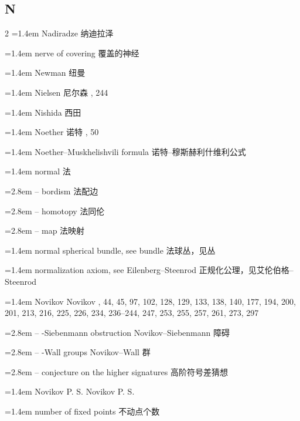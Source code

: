 \subsection*{N}
\small
\begin{multicols}{2}
\noindent\hangindent=1.4em Nadiradze \quad 纳迪拉泽 \par
\noindent\hangindent=1.4em nerve of covering \quad 覆盖的神经 \par
\noindent\hangindent=1.4em Newman \quad 纽曼 \par
\noindent\hangindent=1.4em Nielsen \quad 尼尔森 , 244\par
\noindent\hangindent=1.4em Nishida \quad 西田 \par
\noindent\hangindent=1.4em Noether \quad 诺特 , 50\par
\noindent\hangindent=1.4em Noether--Muskhelishvili formula \quad 诺特--穆斯赫利什维利公式 \par
\noindent\hangindent=1.4em normal \quad 法 \quad\par
\noindent\hangindent=2.8em -- bordism \quad 法配边 \par
\noindent\hangindent=2.8em -- homotopy \quad 法同伦 \par
\noindent\hangindent=2.8em -- map \quad 法映射 \par
\noindent\hangindent=1.4em normal spherical bundle, see bundle \quad 法球丛，见丛 \quad\par
\noindent\hangindent=1.4em normalization axiom, see Eilenberg--Steenrod \quad 正规化公理，见艾伦伯格--Steenrod \quad\par
\noindent\hangindent=1.4em Novikov \quad Novikov , 44, 45, 97, 102, 128, 129, 133, 138, 140, 177, 194, 200, 201, 213, 216, 225, 226, 234, 236--244, 247, 253, 255, 257, 261, 273, 297\par
\noindent\hangindent=2.8em -- -Siebenmann obstruction \quad Novikov--Siebenmann 障碍 \par
\noindent\hangindent=2.8em -- -Wall groups \quad Novikov--Wall 群 \par
\noindent\hangindent=2.8em -- conjecture on the higher signatures \quad 高阶符号差猜想 \par
\noindent\hangindent=1.4em Novikov P. S. \quad Novikov P. S. \par
\noindent\hangindent=1.4em number of fixed points \quad 不动点个数 \par
\end{multicols}

